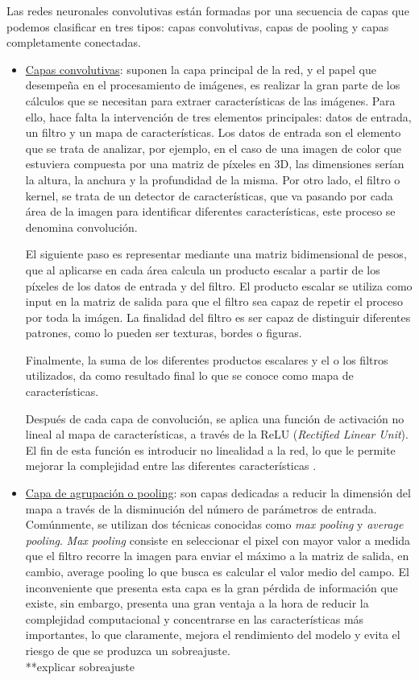 Las redes neuronales convolutivas están formadas por una secuencia de capas que podemos clasificar en tres tipos: capas convolutivas, capas de pooling y capas completamente conectadas.\\ 
\begin{itemize}
	\item \underline{Capas convolutivas}: suponen la capa principal de la red, y el papel que desempeña en el procesamiento de imágenes, es realizar la gran parte de los cálculos que se necesitan para extraer características de las imágenes. Para ello, hace falta la intervención de tres elementos principales: datos de entrada, un filtro y un mapa de características. 
	Los datos de entrada son el elemento que se trata de analizar, por ejemplo, en el caso de una imagen de color que estuviera compuesta por una matriz de píxeles en 3D, las dimensiones serían la altura, la anchura y la profundidad de la misma. 
	Por otro lado, el filtro o kernel, se trata de un detector de características, que va pasando por cada área de la imagen para identificar diferentes características, este proceso se denomina convolución. 

	El siguiente paso es representar mediante una matriz bidimensional de pesos, que al aplicarse en cada área calcula un producto escalar a partir de los píxeles de los datos de entrada y del filtro. El producto escalar se utiliza como input en la matriz de salida para que el filtro sea capaz de repetir el proceso por toda la imágen. La finalidad del filtro es ser capaz de distinguir diferentes patrones, como lo pueden ser texturas, bordes o figuras. 
	
	Finalmente, la suma de los diferentes productos escalares y el o los filtros utilizados, da como resultado final lo que se conoce como mapa de características. 
	
	Después de cada capa de convolución, se aplica una función de activación no lineal al mapa de características, a través de la ReLU (\textit{Rectified Linear Unit}). El fin de esta función es introducir no linealidad a la red, lo que le permite mejorar la complejidad entre las diferentes características \citep{krizhevsky2017imagenet}. \\
	
\item	\underline{Capa de agrupación o pooling}: son capas dedicadas a reducir la dimensión del mapa a través de la disminución del número de parámetros de entrada.
	Comúnmente, se utilizan dos técnicas conocidas como \textit{max pooling} y \textit{average pooling}. \textit{Max pooling} consiste en seleccionar el pixel con mayor valor a medida que el filtro recorre la imagen para enviar el máximo a la matriz de salida, en cambio, average pooling lo que busca es calcular el valor medio del campo. El inconveniente que presenta esta capa es la gran pérdida de información que existe, sin embargo, presenta una gran ventaja a la hora de reducir la complejidad computacional y concentrarse en las características más importantes, lo que claramente, mejora el rendimiento del modelo y evita el riesgo de que se produzca un sobreajuste.\\ **explicar sobreajuste
	

\end{itemize}
